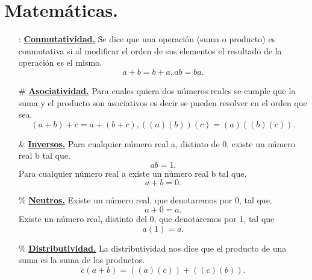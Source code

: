 \documentclass[12pt,letterpaper]{article}
\begin{document}
    \section*{Matemáticas.}
    \begin{itemize}
        \item[:] \textbf{\underline{{Conmutatividad.}}}\newline
        Se dice que una operación (suma o producto) es conmutativa si al modificar el orden de sus elementos el resultado de la operación es el mismo.
        $$a+b=b+a,ab=ba.$$
        \item[\#] \textbf{\underline{{Asociatividad.}}}\newline
        Para cuales quiera dos números reales se cumple que la suma y el producto son asociativos es decir se pueden resolver en el orden que sea.
        $$(a+b)+c=a+(b+c), ((a)(b))(c)=(a)((b)(c)).$$
        \item[\&] \textbf{\underline{Inversos.}}\newline
        Para cualquier número real a, distinto de 0, existe un
        número real b tal que.
        $$ab=1.$$
        Para cualquier número real a existe un número real b tal que.
        $$a+b=0.$$
        \item[\%] \textbf{\underline{{Neutros.}}}\newline
        Existe un número real, que denotaremos por
        0, tal que.
        $$a+0=a.$$
         Existe un número real, distinto del
         0, que denotaremos por 1, tal que
        $$a(1)=a.$$
        \item[\%] \textbf{\underline{{Distributividad.}}}\newline
        La distributividad nos dice que el producto de una suma es la suma de los productos.
        $$c(a+b)=((a)(c))+((c)(b)).$$
    \end{itemize}
\end{document}
